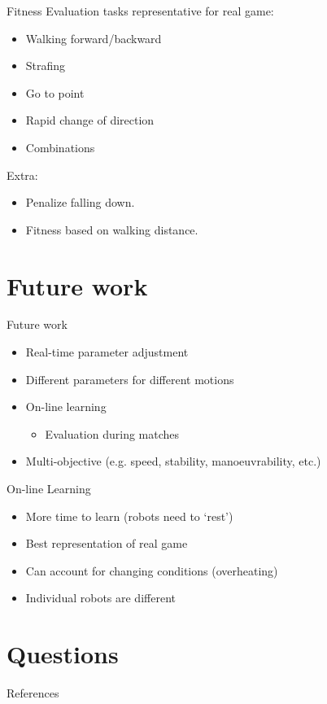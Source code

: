 \documentclass{beamer}
\begin{document}
\begin{frame}{Fitness}
    Evaluation tasks representative for real game:
    \begin{itemize}
        \item Walking forward/backward
		\item Strafing
	    \item Go to point
		\item Rapid change of direction
		\item Combinations
    \end{itemize}

    Extra:
    \begin{itemize}
    \item Penalize falling down.    
    \item Fitness based on walking distance.
    \end{itemize}
\end{frame}

\section{Future work}
\begin{frame}{Future work}
\begin{itemize}
\item Real-time parameter adjustment
\item Different parameters for different motions
\item On-line learning
	\begin{itemize}
		\item Evaluation during matches
	\end{itemize}
\item Multi-objective (e.g. speed, stability, manoeuvrability, etc.)
\end{itemize}
\end{frame}

\begin{frame}{On-line Learning}
\begin{itemize}
\item More time to learn (robots need to `rest')
\item Best representation of real game
\item Can account for changing conditions (overheating)
\item Individual robots are different
\end{itemize}
\end{frame}

\section{Questions}

\begin{frame}{References}
	
	
\end{frame}
\end{document}
